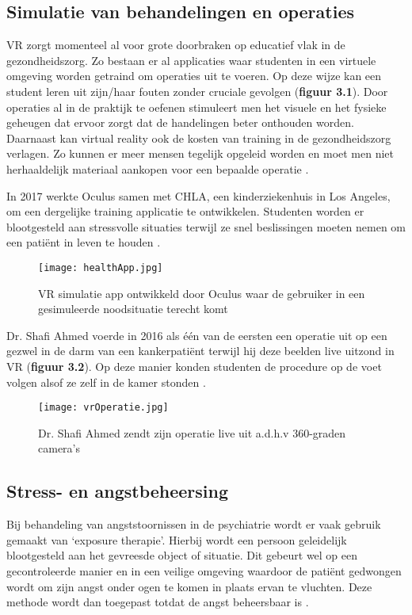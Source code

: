 \subsection{Simulatie van behandelingen en operaties}
VR zorgt momenteel al voor grote doorbraken op educatief vlak in de gezondheidszorg. Zo bestaan er al applicaties waar studenten in een virtuele omgeving worden getraind om operaties uit te voeren. Op deze wijze kan een student leren uit zijn/haar fouten zonder cruciale gevolgen (\textbf{figuur 3.1}). Door operaties al in de praktijk te oefenen stimuleert men het visuele en het fysieke geheugen dat ervoor zorgt dat de handelingen beter onthouden worden. Daarnaast kan virtual reality ook de kosten van training in de gezondheidszorg verlagen. Zo kunnen er meer mensen tegelijk opgeleid worden en moet men niet herhaaldelijk materiaal aankopen voor een bepaalde operatie \autocite{Elion2018}.

In 2017 werkte Oculus samen met CHLA, een kinderziekenhuis in Los Angeles, om een dergelijke training applicatie te ontwikkelen. Studenten worden er blootgesteld aan stressvolle situaties terwijl ze snel beslissingen moeten nemen om een patiënt in leven te houden \autocite{Adobe2018}.

\begin{figure}[h]
    \centering
    \texttt{[image: healthApp.jpg]}
    \caption{VR simulatie app ontwikkeld door Oculus waar de gebruiker in een gesimuleerde noodsituatie terecht komt \autocite{Adobe2018}}
\end{figure}

Dr. Shafi Ahmed voerde in 2016  als één van de eersten een operatie uit op een gezwel in de darm van een kankerpatiënt terwijl hij deze beelden live uitzond in VR (\textbf{figuur 3.2}). Op deze manier konden studenten de procedure op de voet volgen alsof ze zelf in de kamer stonden \autocite{Pelta2017}.

\begin{figure}[h]
    \centering
    \texttt{[image: vrOperatie.jpg]}
    \caption{Dr. Shafi Ahmed zendt zijn operatie live uit a.d.h.v 360-graden camera's \autocite{Realities2019}}
\end{figure}

\subsection{Stress- en angstbeheersing}  
Bij behandeling van angststoornissen in de psychiatrie wordt er vaak gebruik gemaakt van ‘exposure therapie’. Hierbij wordt een persoon geleidelijk blootgesteld aan het gevreesde object of situatie. Dit gebeurt wel op een gecontroleerde manier en in een veilige omgeving waardoor de patiënt gedwongen wordt om zijn angst onder ogen te komen in plaats ervan te vluchten. Deze methode wordt dan toegepast totdat de angst beheersbaar is \autocite{Keller2018}. 

